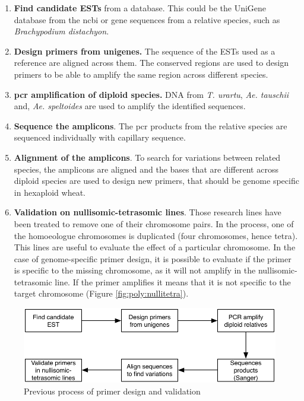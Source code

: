 \begin{enumerate}
    \item \textbf{Find candidate ESTs} from a database. This could be the UniGene database from the \gls{ncbi} or gene sequences from a relative species, such as \textit{Brachypodium distachyon}.
    \item \textbf{Design primers from unigenes.} The sequence of the ESTs used as a reference are aligned across them. The conserved regions are used to design primers to be able to amplify the same region across different species.
    \item \textbf{\gls{pcr} amplification of diploid species.} DNA from \textit{T. urartu}, \textit{Ae. tauschii} and, \textit{Ae. speltoides} are used to amplify the identified sequences. 
    \item \textbf{Sequence the amplicons}. The \gls{pcr} products from the relative species are sequenced individually with capillary sequence. 
    \item \textbf{Alignment of the amplicons}. To search for variations between related species, the amplicons are aligned and the bases that are different across diploid species are used to design new primers, that should be genome specific in hexaploid wheat. 
    \item \textbf{Validation on nullisomic-tetrasomic lines}. 
Those research lines have been treated to remove one of their chromosome pairs. 
In the process, one of the homoeologue chromosomes is duplicated (four chromosomes, hence tetra).
This lines are useful to evaluate the effect of a particular chromosome. 
In the case of genome-specific primer design, it is possible to evaluate if the primer is specific to the missing chromosome, as it will not amplify in the nullisomic-tetrasomic line. 
If the primer amplifies it means that it is not specific to the target chromosome 
(Figure \ref{fig:poly:nullitetra}).
\end{enumerate}

\begin{figure}
\includegraphics[width=1\textwidth]{PolyMarker/Figures/disc/OldGSP.pdf}
\caption{Previous process of primer design and validation}
\label{fig:poly:oldGSP}
\end{figure}

